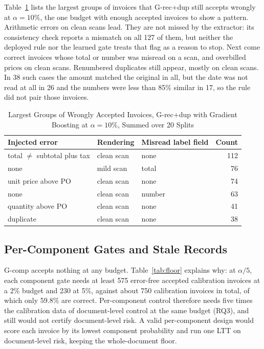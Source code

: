 \documentclass[conference]{IEEEtran}
\newcommand{\sysFC}{\textsf{G-comp}}       %
\newcommand{\sysPdup}{\textsf{G-rec+dup}}  %
\begin{document}
Table~\ref{tab:failures} lists the largest groups of invoices that \sysPdup{}
still accepts wrongly at $\alpha=10\%$, the one budget with enough accepted invoices to show a pattern. Arithmetic errors on clean scans lead. They are
not missed by the extractor: its consistency check reports a mismatch on all 127 of them, but neither the
deployed rule nor the learned gate treats that flag as a reason to stop. Next come correct invoices whose total or
number was misread on a scan, and overbilled prices on clean scans. Renumbered duplicates still appear, mostly on
clean scans. In 38 such cases the amount matched the original in all, but the date was not
read at all in 26 and the numbers were less than 85\% similar in 17, so the rule did not pair those invoices.

\begin{table}[t]
\caption{Largest Groups of Wrongly Accepted Invoices, \sysPdup{} with Gradient
Boosting at \boldmath$\alpha=10\%$, Summed over 20 Splits}
\begin{center}
\footnotesize
\setlength{\tabcolsep}{3pt}
\begin{tabular}{|l|l|l|r|}
\hline
\textbf{Injected error} & \textbf{Rendering} & \textbf{Misread label field} & \textbf{Count} \\
\hline
total $\neq$ subtotal plus tax & clean scan & none & 112 \\
none & mild scan & total & 76 \\
unit price above PO & clean scan & none & 74 \\
none & clean scan & number & 63 \\
quantity above PO & clean scan & none & 41 \\
duplicate & clean scan & none & 38 \\
\hline
\end{tabular}
\label{tab:failures}
\end{center}
\end{table}

\subsection{Per-Component Gates and Stale Records}\label{sec:rq34}
\sysFC{} accepts nothing at any budget. Table~\ref{tab:floor} explains why: at
$\alpha/5$, each component gate needs at least 575 error-free accepted
calibration invoices at a 2\% budget and 230 at 5\%, against about 750
calibration invoices in total, of which only 59.8\% are correct. Per-component
control therefore needs five times the calibration data of document-level
control at the same budget (RQ3), and still would not certify document-level
risk. A valid per-component design would score each
invoice by its lowest component probability and run one LTT on document-level
risk, keeping the whole-document floor.
\end{document}
